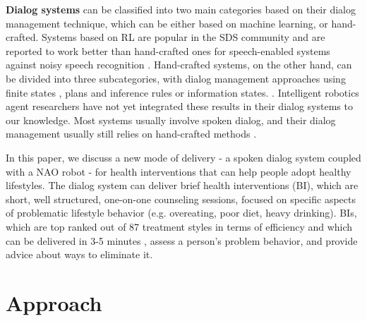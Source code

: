 \documentclass[letterpaper]{article}
\begin{document}
{\bf Dialog systems} can be classified into two main categories based on their dialog management 
technique, which can be either based on machine learning, or hand-crafted.  Systems based on RL are 
popular in the SDS community and are reported to work better than hand-crafted ones for  
speech-enabled systems against noisy speech recognition \cite{young2013pomdp}. 
Hand-crafted systems, on the other hand, can be divided into three subcategories, with dialog 
management approaches using finite states \cite{sutton1998CSLU}, plans and inference rules 
\cite{ferguson1998trips,Bohus2009} or information states. \cite{Traum03}. Intelligent robotics agent 
researchers have not yet integrated these results in their dialog systems to our knowledge. Most 
systems usually involve spoken dialog, and their dialog management usually still relies on 
hand-crafted methods \cite{morbiniFlores2012,Bickmore2010}. 

In this paper, we discuss a new mode of delivery - a spoken dialog system coupled with a NAO robot - 
for health interventions that can help people adopt healthy lifestyles.  The dialog system can 
deliver brief health interventions (BI), which are short, well structured, one-on-one counseling 
sessions, focused on specific aspects of problematic lifestyle behavior (e.g. overeating, poor diet, 
heavy drinking). BIs, which are top ranked out of 87 treatment styles in terms of efficiency 
\cite{miller2002mesa} and which can be delivered in 3-5 minutes \cite{Moyer2002}, assess a person's 
problem behavior, and provide advice about ways to eliminate it. 


\section*{Approach}
\end{document}
